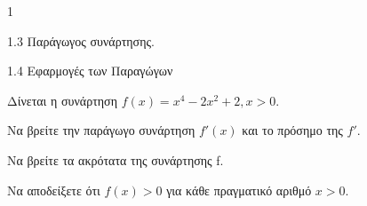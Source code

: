 \begin{ylh}{1}
	\item 1.3 Παράγωγος συνάρτησης.
	\item 1.4 Εφαρμογές των Παραγώγων
\end{ylh}
Δίνεται η συνάρτηση $f(x) = x^4 - 2x^2 + 2, x > 0$.
\begin{alist}
	\item Να βρείτε την παράγωγο συνάρτηση $f'(x)$ και το πρόσημο της $f'$. 
	\item Να βρείτε τα ακρότατα της συνάρτησης f. 
	\item Να αποδείξετε ότι $f(x) > 0$ για κάθε πραγματικό αριθμό $x > 0$. 
\end{alist}

